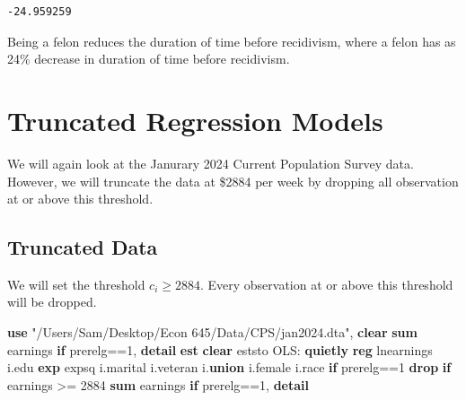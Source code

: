 \documentclass[
]{book}
\newenvironment{Shaded}{\begin{snugshade}}{\end{snugshade}}
\newcommand{\FunctionTok}[1]{\textcolor[rgb]{0.13,0.29,0.53}{\textbf{#1}}}
\newcommand{\KeywordTok}[1]{\textcolor[rgb]{0.13,0.29,0.53}{\textbf{#1}}}
\newcommand{\NormalTok}[1]{#1}
\newcommand{\StringTok}[1]{\textcolor[rgb]{0.31,0.60,0.02}{#1}}
\begin{document}
\begin{verbatim}
-24.959259
\end{verbatim}

Being a felon reduces the duration of time before recidivism, where a felon has as 24\% decrease in duration of time before recidivism.

\chapter{Truncated Regression Models}\label{truncated-regression-models}

We will again look at the Janurary 2024 Current Population Survey data. However, we will truncate the data at \$2884 per week by dropping all observation at or above this threshold.

\section{Truncated Data}\label{truncated-data}

We will set the threshold \(c_i \geq 2884\). Every observation at or above this threshold will be dropped.

\begin{Shaded}
\begin{Highlighting}[]
\KeywordTok{use} \StringTok{"/Users/Sam/Desktop/Econ 645/Data/CPS/jan2024.dta"}\NormalTok{, }\KeywordTok{clear}
\KeywordTok{sum}\NormalTok{ earnings }\KeywordTok{if}\NormalTok{ prerelg==1, }\KeywordTok{detail}
\KeywordTok{est} \KeywordTok{clear}
\NormalTok{eststo OLS: }\KeywordTok{quietly} \KeywordTok{reg}\NormalTok{ lnearnings i.edu }\FunctionTok{exp}\NormalTok{ expsq i.marital i.veteran i.}\KeywordTok{union}\NormalTok{ i.female i.race }\KeywordTok{if}\NormalTok{ prerelg==1}
\KeywordTok{drop} \KeywordTok{if}\NormalTok{ earnings \textgreater{}= 2884}
\KeywordTok{sum}\NormalTok{ earnings }\KeywordTok{if}\NormalTok{ prerelg==1, }\KeywordTok{detail}
\end{Highlighting}
\end{Shaded}
\end{document}
